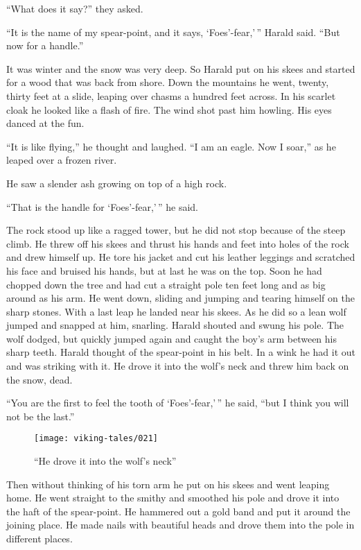 ``What does it say?'' they asked.

``It is the name of my spear-point, and it says, `Foes'-fear,'\,'' Harald
said. ``But now for a handle.''

It was winter and the snow was very deep. So Harald put on his skees and
started for a wood that was back from shore. Down the mountains he went,
twenty, thirty feet at a slide, leaping over chasms a hundred feet
across. In his scarlet cloak he looked like a flash of fire. The wind
shot past him howling. His eyes danced at the fun.

``It is like flying,'' he thought and laughed. ``I am an eagle. Now I
soar,'' as he leaped over a frozen river.

He saw a slender ash growing on top of a high rock.

``That is the handle for `Foes'-fear,'\,'' he said.

The rock stood up like a ragged tower, but he did not stop because of
the steep climb. He threw off his skees and thrust his hands and feet
into holes of the rock and drew himself up. He tore his jacket and cut
his leather leggings and scratched his face and bruised his hands, but
at last he was on the top. Soon he had chopped down the tree and had cut
a straight pole ten feet long and as big around as his arm. He went
down, sliding and jumping and tearing himself on the sharp stones. With
a last leap he landed near his skees. As he did so a lean wolf jumped
and snapped at him, snarling. Harald shouted and swung his pole. The
wolf dodged, but quickly jumped again and caught the boy's arm between
his sharp teeth. Harald thought of the spear-point in his belt. In a
wink he had it out and was striking with it. He drove it into the wolf's
neck and threw him back on the snow, dead.

``You are the first to feel the tooth of `Foes'-fear,'\,'' he said, ``but
I think you will not be the last.''

\begin{figure}[ht]
    \centering
    \texttt{[image: viking-tales/021]}
    \caption{``He drove it into the wolf's neck''}
\end{figure}

Then without thinking of his torn arm he put on his skees and went
leaping home. He went straight to the smithy and smoothed his pole and
drove it into the haft of the spear-point. He hammered out a gold band
and put it around the joining place. He made nails with beautiful heads
and drove them into the pole in different places.

